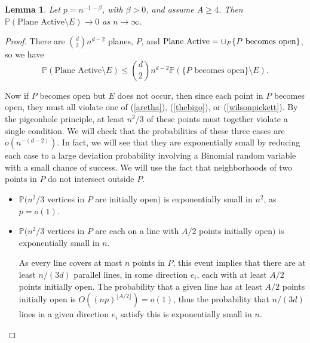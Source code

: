 \documentclass{amsart}
\newcommand{\prob}{\mathbb{P}}
\newcommand{\D}{\text{Plane Active}}
\newcommand{\plane}{P}
\numberwithin{equation}{section}
\newtheorem{lemma}[theorem]{Lemma}
\theoremstyle{definition}
\theoremstyle{remark}
\begin{document}
\begin{lemma} \label{activenotE}
Let $p = n^{-1-\beta}$, with $\beta > 0$, and assume $A\ge 4$. 
Then $\prob(\D \setminus E) \to 0$ as $n \to \infty$.
\end{lemma}
\begin{proof}
There are ${d \choose 2}n^{d-2}$ planes, $\plane$, and
$\D = \cup_\plane \{\hbox{$\plane$ becomes open}\}$,
so we have
$$\prob(\D \setminus E) \le {d \choose 2}n^{d-2} \prob(\{{\plane}\text{ becomes open}\}\setminus E).$$

Now if $\plane$ becomes open but $E$ does not occur, then since each point in $\plane$ becomes open, they must all violate one of (\ref{aretha}), (\ref{thebigo}), or (\ref{wilsonpickett}). By the pigeonhole principle, at least $n^2/3$ of these points must together violate a single condition. We will check that the probabilities of these three cases are $o(n^{-(d-2)})$. In fact, we will see
that they are exponentially small by reducing each case to a large deviation probability 
involving a Binomial random variable with a small chance of success. We will use
the fact that neighborhoods of two points in $\plane$ do not intersect outside $\plane$. 

\begin{itemize}
\item $\prob(n^2/3$ vertices in $\plane$ are initially open$)$ is exponentially small 
in $n^2$, as $p=o(1)$.  

\item $\prob(n^2/3$ vertices in $\plane$ are each on a line with $A/2$ points initially open$)$
is exponentially small in $n$. 

As every line covers at most $n$ points in $\plane$, this event implies that there 
are at least $n/(3d)$ parallel lines, in some direction $e_i$,  
each with at least $A/2$ points initially open.  
The probability that a given line has at least $A/2$ points initially 
open is $O((np)^{\lfloor A/2\rfloor})=o(1)$, thus the probability that $n/(3d)$ lines in a given direction 
$e_i$ satisfy this is exponentially small in $n$.

\begin{comment}
 The probability of this is at most
$$2{n \choose n/6}\left({n \choose A/2}p^{A/2}\right)^{n/6}\leq 
2\cdot 2^n\left(n^{-\beta A/2}\right)^{n/6}\leq 2\cdot 2^n n^{-n/6}
=o\left(n^{-(d-2)}\right) .$$
\end{comment}


\end{itemize}
\end{proof}
\end{document}
